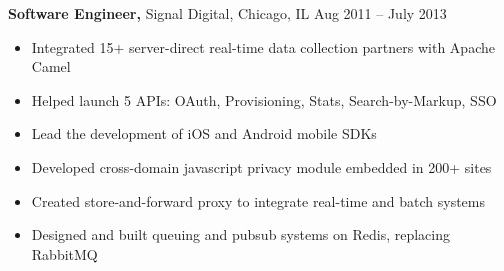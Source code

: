 \documentclass[margin]{res}
\begin{document}
\begin{resume}
 {\bf Software Engineer,} Signal Digital, Chicago, IL \hfill Aug 2011 -- July 2013
 \begin{itemize} \itemsep -2pt  %
  \item Integrated 15+ server-direct real-time data collection partners with Apache Camel
  \item Helped launch 5 APIs: OAuth, Provisioning, Stats, Search-by-Markup, SSO
  \item Lead the development of iOS and Android mobile SDKs
  \item Developed cross-domain javascript privacy module embedded in 200+ sites
  \item Created store-and-forward proxy to integrate real-time and batch systems
  \item Designed and built queuing and pubsub systems on Redis, replacing RabbitMQ
 \end{itemize}





\end{resume}
\end{document}
